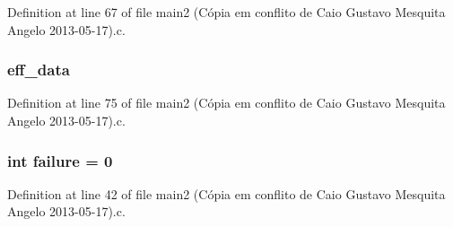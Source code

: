 Definition at line 67 of file main2 (\-Cópia em conflito de Caio Gustavo Mesquita Angelo 2013-\/05-\/17).\-c.

\hypertarget{main2_01_07C_xC3_xB3pia_01em_01conflito_01de_01Caio_01Gustavo_01Mesquita_01Angelo_012013-05-17_08_8c_a5650ece8c3a277c7f158d75ae65265fa}{
\subsubsection[{eff\-\_\-data}]{ eff\-\_\-data}}\label{main2_01_07C_xC3_xB3pia_01em_01conflito_01de_01Caio_01Gustavo_01Mesquita_01Angelo_012013-05-17_08_8c_a5650ece8c3a277c7f158d75ae65265fa}


Definition at line 75 of file main2 (\-Cópia em conflito de Caio Gustavo Mesquita Angelo 2013-\/05-\/17).\-c.

\hypertarget{main2_01_07C_xC3_xB3pia_01em_01conflito_01de_01Caio_01Gustavo_01Mesquita_01Angelo_012013-05-17_08_8c_a4f35e5ea2395561d0bd3b2f45612dc2c}{
\subsubsection[{failure}]{\setlength{\rightskip}{0pt plus 5cm}int failure = 0}}\label{main2_01_07C_xC3_xB3pia_01em_01conflito_01de_01Caio_01Gustavo_01Mesquita_01Angelo_012013-05-17_08_8c_a4f35e5ea2395561d0bd3b2f45612dc2c}


Definition at line 42 of file main2 (\-Cópia em conflito de Caio Gustavo Mesquita Angelo 2013-\/05-\/17).\-c.

